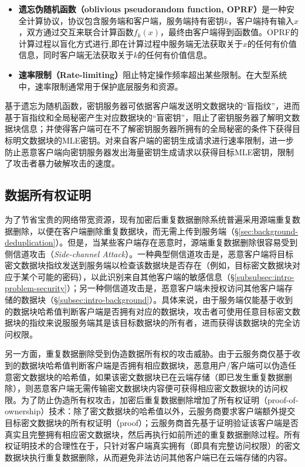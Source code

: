 \begin{itemize}
    \item \textbf{遗忘伪随机函数（oblivious pseudorandom function, OPRF）}\cite{naor2004Number}是一种安全计算协议，协议包含服务端和客户端，服务端持有密钥$k$，客户端持有输入$x$，双方通过交互来联合计算函数$f_k(x)$，最终由客户端得到函数值。OPRF的计算过程以盲化方式进行,即在计算过程中服务端无法获取关于$x$的任何有价值信息，同时客户端无法获取关于$k$的任何有价值信息。
    \item \textbf{速率限制（Rate-limiting）}\cite{bellare2013DupLESS}阻止特定操作频率超出某些限制。在大型系统中，速率限制通常用于保护底层服务和资源。
\end{itemize}

基于遗忘为随机函数，密钥服务器可依据客户端发送明文数据块的“盲指纹”，进而基于盲指纹和全局秘密产生对应数据块的“盲密钥”，阻止了密钥服务器了解明文数据块信息；并使得客户端可在不了解密钥服务器所拥有的全局秘密的条件下获得目标明文数据块的MLE密钥。对来自客户端的密钥生成请求进行速率限制，进一步防止恶意客户端向密钥服务器发出海量密钥生成请求以获得目标MLE密钥，限制了攻击者暴力破解攻击的速度。

\subsection{数据所有权证明}
\label{subsec:background-encrypted-deduplication-pow}

为了节省宝贵的网络带宽资源，现有加密后重复数据删除系统普遍采用源端重复数据删除，以便在客户端删除重复数据块，而无需上传到服务端（\S\ref{sec:background-deduplication}）。但是，当某些客户端存在恶意时，源端重复数据删除很容易受到侧信道攻击（\textit{Side-channel Attack}）\cite{harnik2010side,halevi11}。一种典型侧信道攻击是，恶意客户端将目标密文数据块指纹发送到服务端以检查该数据块是否存在（例如，目标密文数据块对应于某个可能的密码\cite{harnik2010side}），以此识别来自其他客户端的敏感信息（\S\ref{subsubsec:intro-problem-security}）；另一种侧信道攻击是，恶意客户端未授权访问其他客户端存储的数据块（\S\ref{subsec:intro-background}）。具体来说，由于服务端仅能基于收到的数据块哈希值判断客户端是否拥有对应的数据块，攻击者可使用任意目标密文数据块的指纹来说服服务端其是该目标数据块的所有者，进而获得该数据块的完全访问权限\cite{halevi11}。

另一方面，重复数据删除受到伪造数据所有权的攻击威胁\cite{harnik2010side,mulazzani11}。由于云服务商仅基于收到的数据块哈希值判断客户端是否拥有相应数据块，恶意用户/客户端可以伪造任意密文数据块的哈希值，如果该密文数据块已在云端存储（即已发生重复数据删除），则恶意客户端无需传输密文数据块内容便可获得相应密文数据块的访问权限。为了防止伪造所有权攻击，加密后重复数据删除增加了所有权证明（proof-of-ownership）技术\cite{halevi11}：除了密文数据块的哈希值以外，云服务商要求客户端额外提交目标密文数据块的所有权证明（proof）；云服务商首先基于证明验证该客户端是否真实且完整拥有相应密文数据块，然后再执行如前所述的重复数据删除过程。所有权证明技术的合理性在于，只针对客户端真实拥有（即具有完整访问权限）的密文数据块执行重复数据删除，从而避免非法访问其他客户端已在云端存储的内容。

